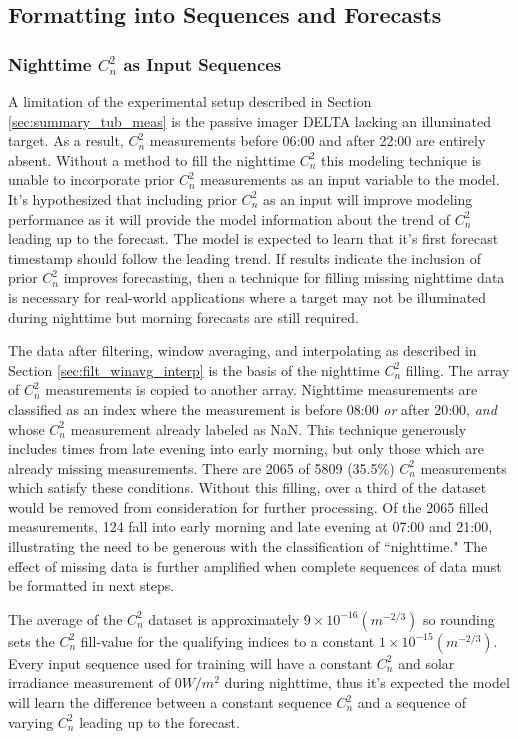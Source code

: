 \subsection{Formatting into Sequences and Forecasts}
\subsubsection{Nighttime $C_{n}^{2}$ as Input Sequences}
A limitation of the experimental setup described in Section \ref{sec:summary_tub_meas} is the passive imager DELTA lacking an illuminated target. As a result, $C_{n}^{2}$ measurements before 06:00 and after 22:00 are entirely absent. Without a method to fill the nighttime $C_{n}^{2}$ this modeling technique is unable to incorporate prior $C_{n}^{2}$ measurements as an input variable to the model. It's hypothesized that including prior $C_{n}^{2}$ as an input will improve modeling performance as it will provide the model information about the trend of $C_{n}^{2}$ leading up to the forecast. The model is expected to learn that it's first forecast timestamp should follow the leading trend. If results indicate the inclusion of prior $C_{n}^{2}$ improves forecasting, then a technique for filling missing nighttime data is necessary for real-world applications where a target may not be illuminated during nighttime but morning forecasts are still required.

The data after filtering, window averaging, and interpolating as described in Section \ref{sec:filt_winavg_interp} is the basis of the nighttime $C_{n}^{2}$ filling. The array of $C_{n}^{2}$ measurements is copied to another array. Nighttime measurements are classified as an index where the measurement is before 08:00 \emph{or} after 20:00, \emph{and} whose $C_{n}^{2}$ measurement already labeled as NaN. This technique generously includes times from late evening into early morning, but only those which are already missing measurements. There are 2065 of 5809 (35.5\%) $C_{n}^{2}$ measurements which satisfy these conditions. Without this filling, over a third of the dataset would be removed from consideration for further processing. Of the 2065 filled measurements, 124 fall into early morning and late evening at 07:00 and 21:00, illustrating the need to be generous with the classification of ``nighttime." The effect of missing data is further amplified when complete sequences of data must be formatted in next steps.

The average of the $C_{n}^{2}$ dataset is approximately $9 \times 10^{-16} (m^{-2/3})$ so rounding sets the $C_{n}^{2}$ fill-value for the qualifying indices to a constant $1 \times 10^{-15} (m^{-2/3})$. Every input sequence used for training will have a constant $C_{n}^{2}$ and solar irradiance measurement of $0 W/m^{2}$ during nighttime, thus it's expected the model will learn the difference between a constant sequence $C_{n}^{2}$ and a sequence of varying $C_{n}^{2}$ leading up to the forecast.

